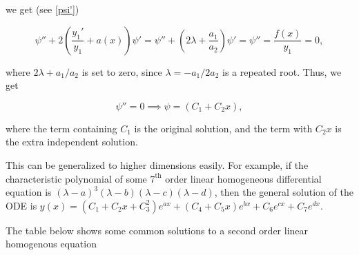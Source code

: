 \documentclass[english,a4paper,12pt]{report}
\begin{document}
we get (see \cref{psi'})

\begin{equation}
    \psi '' + 2 \left(\frac{y_1 '}{y_1 } + a(x) \right)\psi' = \psi '' + \left(2\lambda + \frac{a_1 }{a_2 } \right)\psi ' = \psi '' = \frac{f(x)}{y_1 } = 0,
\end{equation}

where \( 2\lambda + a_1 /a_2  \) is set to zero, since \(\lambda = -a_1 /2a_2  \) is a repeated root. Thus, we get

\begin{equation}
    \psi '' = 0 \implies \psi = (C_1 + C_2 x),
\end{equation}

where the term containing \(C_1 \) is the original solution, and the term with \(C_2 x\) is the extra independent solution. 

This can be generalized to higher dimensions easily. For example, if the characteristic polynomial of some \(7^{\text{th}} \) order linear homogeneous differential equation is \((\lambda -a)^3 (\lambda -b)(\lambda - c)(\lambda - d)\), then the general solution of the ODE is \( y(x) = (C_1 +C_2 x+C_3 ^2)e^{ax} + (C_4 +C_5x )e^{bx} + C_6 e^{cx} + C_7 e^{dx}    \).    

The table below shows some common solutions to a second order linear homogenous equation

\renewcommand{\arraystretch}{1.5} %
\end{document}
